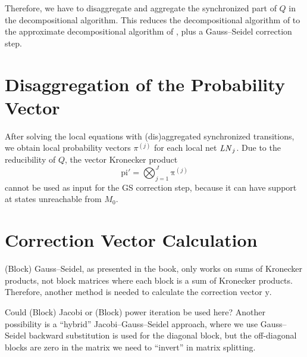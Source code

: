 \documentclass[a4paper,10pt,twoside,openright]{memoir}
\newcommand*{\LN}{\textnormal{\emph{LN}}}
\renewcommand*{\vec}[1]{\boldsymbol{\mathrm{#1}}}
\begin{document}
Therefore, we have to disaggregate and aggregate the synchronized part
of $Q$ in the decompositional algorithm. This reduces the
decompositional algorithm of \citet{bao2008decompositional} to the
approximate decompositional algorithm of
\citet{DBLP:journals/sigmetrics/BuchholzK98}, plus a Gauss--Seidel
correction step.

\section{Disaggregation of the Probability Vector}

After solving the local equations with (dis)aggregated synchronized
transitions, we obtain local probability vectors $\pi^{(j)}$ for each
local net $\LN_j$. Due to the reducibility of $Q$, the
vector Kronecker product
\begin{equation}
  \vec{pi}' = \bigotimes_{j = 1}^J \vec{\pi}^{(j)}
\end{equation}
cannot be used as input for the GS correction step, because it can
have support at states unreachable from $M_0$.

\section{Correction Vector Calculation}

(Block) Gauss--Seidel, as presented in the book, only works on sums of
Kronecker products, not block matrices where each block is a sum of
Kronecker products. Therefore, another method is needed to calculate
the correction vector $\vec{y}$.

Could (Block) Jacobi or (Block) power iteration \citep[Section
3.2]{dayar2012analyzing} be used here? Another possibility is a
``hybrid'' Jacobi--Gauss--Seidel approach, where we use Gauss--Seidel
backward substitution is used for the diagonal block, but the
off-diagonal blocks are zero in the matrix we need to ``invert'' in
matrix splitting.

\backmatter

\printbibliography
\end{document}
